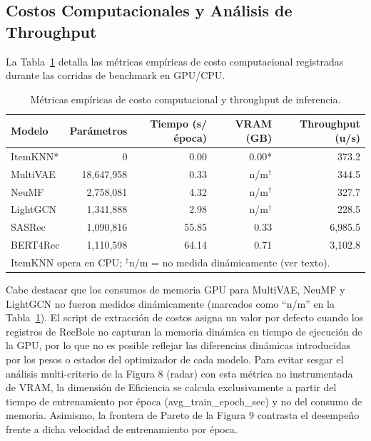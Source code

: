 \documentclass[journal]{IEEEtran}
\begin{document}
\subsection{Costos Computacionales y Análisis de Throughput}
La Tabla~\ref{tab:compute} detalla las métricas empíricas de costo computacional registradas durante las corridas de benchmark en GPU/CPU.

\begin{table}[h]
\centering
\caption{Métricas empíricas de costo computacional y throughput de inferencia.}
\label{tab:compute}
\footnotesize
\setlength{\tabcolsep}{2.5pt}
\begin{tabular}{lrrrr}
\toprule
\textbf{Modelo} & \textbf{Parámetros} & \textbf{Tiempo (s/época)} & \textbf{VRAM (GB)} & \textbf{Throughput (u/s)} \\
\midrule
ItemKNN*  & 0          & 0.00 & 0.00* & 373.2 \\
MultiVAE  & 18,647,958 & 0.33 & n/m$^\dagger$  & 344.5 \\
NeuMF     & 2,758,081  & 4.32 & n/m$^\dagger$  & 327.7 \\
LightGCN  & 1,341,888  & 2.98 & n/m$^\dagger$  & 228.5 \\
SASRec    & 1,090,816  & 55.85 & 0.33 & 6,985.5 \\
BERT4Rec  & 1,110,598  & 64.14 & 0.71 & 3,102.8 \\
\bottomrule
\multicolumn{5}{l}{\scriptsize *ItemKNN opera en CPU; $^\dagger$n/m = no medida dinámicamente (ver texto).}
\end{tabular}
\end{table}

Cabe destacar que los consumos de memoria GPU para MultiVAE, NeuMF y LightGCN no fueron medidos dinámicamente (marcados como ``n/m'' en la Tabla~\ref{tab:compute}). El script de extracción de costos asigna un valor por defecto cuando los registros de RecBole no capturan la memoria dinámica en tiempo de ejecución de la GPU, por lo que no es posible reflejar las diferencias dinámicas introducidas por los pesos o estados del optimizador de cada modelo. Para evitar sesgar el análisis multi-criterio de la Figura 8 (radar) con esta métrica no instrumentada de VRAM, la dimensión de Eficiencia se calcula exclusivamente a partir del tiempo de entrenamiento por época (avg\_train\_epoch\_sec) y no del consumo de memoria. Asimismo, la frontera de Pareto de la Figura 9 contrasta el desempeño frente a dicha velocidad de entrenamiento por época.
\end{document}
